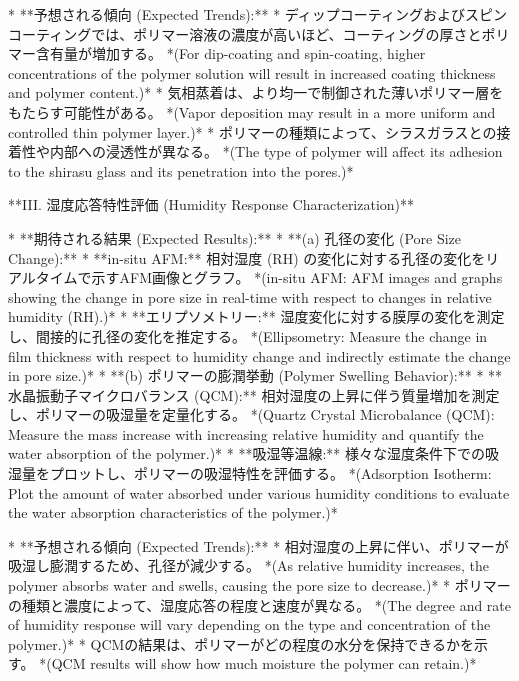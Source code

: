\documentclass{article}
\begin{document}
*   **予想される傾向 (Expected Trends):**
    *   ディップコーティングおよびスピンコーティングでは、ポリマー溶液の濃度が高いほど、コーティングの厚さとポリマー含有量が増加する。
        *(For dip-coating and spin-coating, higher concentrations of the polymer solution will result in increased coating thickness and polymer content.)*
    *   気相蒸着は、より均一で制御された薄いポリマー層をもたらす可能性がある。
        *(Vapor deposition may result in a more uniform and controlled thin polymer layer.)*
    *   ポリマーの種類によって、シラスガラスとの接着性や内部への浸透性が異なる。
        *(The type of polymer will affect its adhesion to the shirasu glass and its penetration into the pores.)*

**III. 湿度応答特性評価 (Humidity Response Characterization)**

*   **期待される結果 (Expected Results):**
    *   **(a) 孔径の変化 (Pore Size Change):**
        *   **in-situ AFM:** 相対湿度 (RH) の変化に対する孔径の変化をリアルタイムで示すAFM画像とグラフ。
            *(in-situ AFM: AFM images and graphs showing the change in pore size in real-time with respect to changes in relative humidity (RH).)*
        *   **エリプソメトリー:** 湿度変化に対する膜厚の変化を測定し、間接的に孔径の変化を推定する。
            *(Ellipsometry: Measure the change in film thickness with respect to humidity change and indirectly estimate the change in pore size.)*
    *   **(b) ポリマーの膨潤挙動 (Polymer Swelling Behavior):**
        *   **水晶振動子マイクロバランス (QCM):** 相対湿度の上昇に伴う質量増加を測定し、ポリマーの吸湿量を定量化する。
            *(Quartz Crystal Microbalance (QCM): Measure the mass increase with increasing relative humidity and quantify the water absorption of the polymer.)*
        *   **吸湿等温線:** 様々な湿度条件下での吸湿量をプロットし、ポリマーの吸湿特性を評価する。
            *(Adsorption Isotherm: Plot the amount of water absorbed under various humidity conditions to evaluate the water absorption characteristics of the polymer.)*

*   **予想される傾向 (Expected Trends):**
    *   相対湿度の上昇に伴い、ポリマーが吸湿し膨潤するため、孔径が減少する。
        *(As relative humidity increases, the polymer absorbs water and swells, causing the pore size to decrease.)*
    *   ポリマーの種類と濃度によって、湿度応答の程度と速度が異なる。
        *(The degree and rate of humidity response will vary depending on the type and concentration of the polymer.)*
    *   QCMの結果は、ポリマーがどの程度の水分を保持できるかを示す。
        *(QCM results will show how much moisture the polymer can retain.)*
\end{document}
